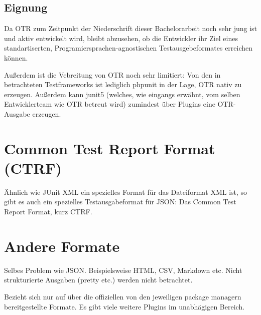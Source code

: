 \subsection{Eignung}
Da OTR zum Zeitpunkt der Niederschrift dieser Bachelorarbeit noch sehr jung ist und aktiv entwickelt wird, bleibt abzusehen, ob die Entwickler ihr Ziel eines standartiserten, Programiersprachen-agnostischen Testausgebeformates erreichen können.

Außerdem ist die Vebreitung von OTR noch sehr limitiert: Von den in  betrachteten Testframeworks ist lediglich phpunit in der Lage, OTR nativ zu erzeugen. Außerdem kann junit5 (welches, wie eingangs erwähnt, vom selben Entwicklerteam wie OTR betreut wird) zumindest über Plugins eine OTR-Ausgabe erzeugen.


\section{Common Test Report Format (CTRF)}
Ähnlich wie JUnit XML ein spezielles Format für das Dateiformat XML ist, so gibt es auch ein spezielles Testausgabeformat für JSON: Das Common Test Report Format, kurz CTRF.  


\section{Andere Formate}
Selbes Problem wie JSON. Beispielsweise HTML, CSV, Markdown etc. Nicht strukturierte Ausgaben (pretty etc.) werden nicht betrachtet.

Bezieht sich nur auf über die offiziellen von den jeweiligen package managern bereitgestellte Formate. Es gibt viele weitere Plugins im unabhägigen Bereich.

